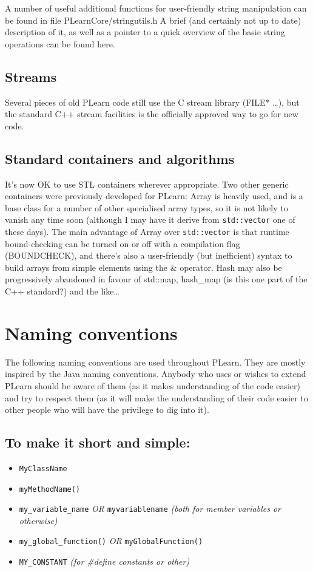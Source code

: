 \documentclass[11pt]{book}
\begin{document}
 A number of useful additional functions for user-friendly string
manipulation can be found in file PLearnCore/stringutils.h A brief
(and certainly not up to date) description of it, as well as a pointer
to a quick overview of the basic string operations can be found here.

\subsection*{Streams}
 Several pieces of old PLearn code still use the C stream library
(FILE* \ldots), but the standard C++ stream facilities is the
officially approved way to go for new code.


\subsection*{Standard containers and algorithms}
 It's now OK to use STL containers wherever appropriate. Two other
generic containers were previously developed for PLearn: Array is
heavily used, and is a base class for a number of other specialised
array types, so it is not likely to vanish any time soon (although
I may have it derive from {\tt std::vector} one of these days). The
main advantage of Array over {\tt std::vector} is that runtime
bound-checking can be turned on or off with a compilation flag
(BOUNDCHECK), and there's also a user-friendly (but inefficient)
syntax to build arrays from simple elements using the \& operator. Hash
may also be progressively abandoned in favour of std::map, hash\_map
(is this one part of the C++ standard?) and the like\ldots


\section{Naming conventions}

 The following naming conventions are used throughout PLearn. They
are mostly inspired by the Java naming conventions. Anybody who
uses or wishes to extend PLearn should be aware of them (as it makes
understanding of the code easier) and try to respect them (as it will
make the understanding of their code easier to other people who will
have the privilege to dig into it).

\subsection*{To make it short and simple:}

\begin{itemize}
\item {\tt MyClassName}
\item {\tt myMethodName()}
\item {\tt my\_variable\_name} \emph{OR }
      {\tt myvariablename} \emph{(both for member variables or otherwise)}

\item {\tt my\_global\_function()} \emph{OR}
      {\tt myGlobalFunction()}
\item {\tt MY\_CONSTANT}  \emph{(for \#define constants or other)}

\end{itemize}
\end{document}
